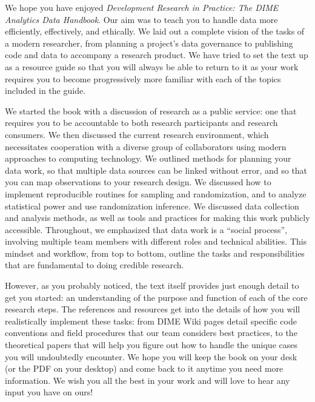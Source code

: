 We hope you have enjoyed \textit{Development Research in Practice: The DIME Analytics Data Handbook}.
Our aim was to teach you to handle data more efficiently, effectively, and ethically.
We laid out a complete vision of the tasks of a modern researcher,
from planning a project's data governance to publishing code and data
to accompany a research product.
We have tried to set the text up as a resource guide
so that you will always be able to return to it
as your work requires you to become progressively more familiar
with each of the topics included in the guide.

We started the book with a discussion of research as a public service:
one that requires you to be accountable to both research participants
and research consumers.
We then discussed the current research environment,
which necessitates cooperation with a diverse group of collaborators
using modern approaches to computing technology.
We outlined methods for planning your data work,
so that multiple data sources can be linked without error,
and so that you can map observations to your research design.
We discussed how to implement reproducible routines for sampling and randomization,
and to analyze statistical power and use randomization inference.
We discussed data collection
and analysis methods,
as well as tools and practices for making this work publicly accessible.
Throughout, we emphasized that data work is a ``social process'',
involving multiple team members with different roles and technical abilities.
This mindset and workflow, from top to bottom,
outline the tasks and responsibilities
that are fundamental to doing credible research.

However, as you probably noticed, the text itself provides
just enough detail to get you started:
an understanding of the purpose and function of each of the core research steps.
The references and resources get into the details
of how you will realistically implement these tasks:
from DIME Wiki pages detail specific code conventions
and field procedures that our team considers best practices,
to the theoretical papers that will help you figure out
how to handle the unique cases you will undoubtedly encounter.
We hope you will keep the book on your desk
(or the PDF on your desktop)
and come back to it anytime you need more information.
We wish you all the best in your work
and will love to hear any input you have on ours!


